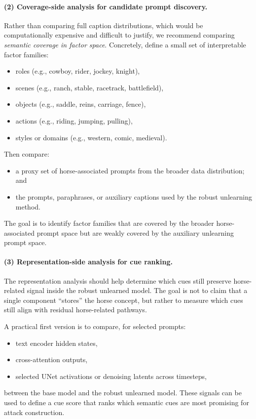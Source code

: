 \paragraph{(2) Coverage-side analysis for candidate prompt discovery.}
Rather than comparing full caption distributions, which would be computationally expensive and difficult to justify, we recommend comparing \emph{semantic coverage in factor space}. Concretely, define a small set of interpretable factor families:
\begin{itemize}
    \item roles (e.g., cowboy, rider, jockey, knight),
    \item scenes (e.g., ranch, stable, racetrack, battlefield),
    \item objects (e.g., saddle, reins, carriage, fence),
    \item actions (e.g., riding, jumping, pulling),
    \item styles or domains (e.g., western, comic, medieval).
\end{itemize}
Then compare:
\begin{itemize}
    \item a proxy set of horse-associated prompts from the broader data distribution; and
    \item the prompts, paraphrases, or auxiliary captions used by the robust unlearning method.
\end{itemize}
The goal is to identify factor families that are covered by the broader horse-associated prompt space but are weakly covered by the auxiliary unlearning prompt space.

\paragraph{(3) Representation-side analysis for cue ranking.}
The representation analysis should help determine which cues still preserve horse-related signal inside the robust unlearned model. The goal is not to claim that a single component ``stores'' the horse concept, but rather to measure which cues still align with residual horse-related pathways.

A practical first version is to compare, for selected prompts:
\begin{itemize}
    \item text encoder hidden states,
    \item cross-attention outputs,
    \item selected UNet activations or denoising latents across timesteps,
\end{itemize}
between the base model and the robust unlearned model. These signals can be used to define a cue score that ranks which semantic cues are most promising for attack construction.

